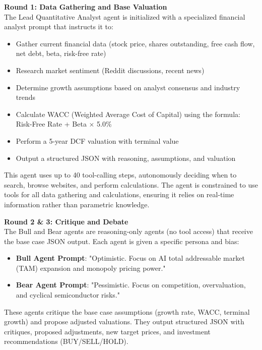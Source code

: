 \documentclass{article}
\begin{document}
\textbf{Round 1: Data Gathering and Base Valuation} \\
The Lead Quantitative Analyst agent is initialized with a specialized financial analyst prompt that instructs it to:
\begin{itemize}
    \item Gather current financial data (stock price, shares outstanding, free cash flow, net debt, beta, risk-free rate)
    \item Research market sentiment (Reddit discussions, recent news)
    \item Determine growth assumptions based on analyst consensus and industry trends
    \item Calculate WACC (Weighted Average Cost of Capital) using the formula: Risk-Free Rate + Beta $\times$ 5.0\%
    \item Perform a 5-year DCF valuation with terminal value
    \item Output a structured JSON with reasoning, assumptions, and valuation
\end{itemize}

This agent uses up to 40 tool-calling steps, autonomously deciding when to search, browse websites, and perform calculations. The agent is constrained to use tools for all data gathering and calculations, ensuring it relies on real-time information rather than parametric knowledge.

\textbf{Round 2 \& 3: Critique and Debate} \\
The Bull and Bear agents are reasoning-only agents (no tool access) that receive the base case JSON output. Each agent is given a specific persona and bias:

\begin{itemize}
    \item \textbf{Bull Agent Prompt}: "Optimistic. Focus on AI total addressable market (TAM) expansion and monopoly pricing power."
    \item \textbf{Bear Agent Prompt}: "Pessimistic. Focus on competition, overvaluation, and cyclical semiconductor risks."
\end{itemize}

These agents critique the base case assumptions (growth rate, WACC, terminal growth) and propose adjusted valuations. They output structured JSON with critiques, proposed adjustments, new target prices, and investment recommendations (BUY/SELL/HOLD).
\end{document}
